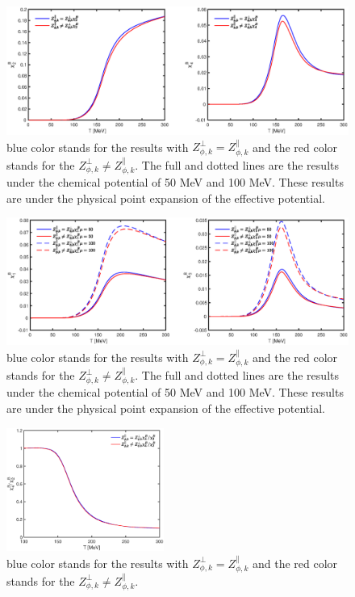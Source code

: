 \documentclass[%
reprint,
superscriptaddress,
showpacs,preprintnumbers,
 amsmath,amssymb,
 aps,
prd,
]{revtex4-1}
\begin{document}
\begin{figure}[t]
\label{fig:chi2chi4}
\includegraphics[width=1.0\textwidth]{chi2chi4.eps}
\caption{blue color stands for the results with $Z^{\bot}_{\phi,k}=Z^{\|}_{\phi,k}$ and the red color stands for the $Z^{\bot}
_{\phi,k}\neq Z^{\|}_{\phi,k} $. The full and dotted lines are the results under the chemical potential of 50 MeV and 100 
MeV. These results are under the physical point expansion of the effective potential. }
\end{figure}



\begin{figure}[t]
\label{fig:chi13}
\includegraphics[width=1.0\textwidth]{chi13.eps}
\caption{blue color stands for the results with $Z^{\bot}_{\phi,k}=Z^{\|}_{\phi,k}$ and the red color stands for the $Z^{\bot}
_{\phi,k}\neq Z^{\|}_{\phi,k} $. The full and dotted lines are the results under the chemical potential of 50 MeV and 100 
MeV. These results are under the physical point expansion of the effective potential. }
\end{figure}




\begin{figure}[t]
\includegraphics[width=0.46\textwidth]{r42.eps}
\caption{blue color stands for the results with $Z^{\bot}_{\phi,k}=Z^{\|}_{\phi,k}$ and the red color stands for the $Z^{\bot}
_{\phi,k}\neq Z^{\|}_{\phi,k} $.}
\label{fig:r42}
\end{figure}
\end{document}
